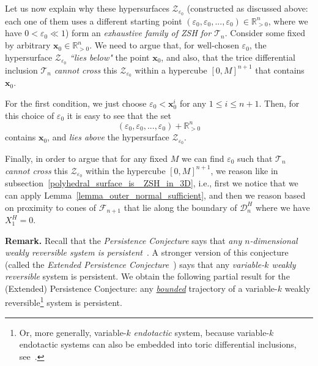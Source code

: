 \documentclass[12pt,letterpaper]{article}
\newcommand{\T}{\mathcal{T}}
\newcommand{\D}{\mathcal{D}}
\newcommand{\F}{\mathcal{F}}
\newcommand{\Z}{\mathcal{Z}}
\newcommand{\x}{\mathbf{x}}
\newcommand{\RRpn}{\mathbb{R}_{>0}^n}
\newcommand{\eps}{\varepsilon}
\begin{document}
Let us now explain why these hypersurfaces $\Z_{\eps_0}$ (constructed as discussed above: each one of them uses a different starting point $(\eps_0, \eps_0, ..., \eps_0) \in \RRpn$, where we have $0 < \eps_0 \ll 1$) form an {\em exhaustive family of ZSH for $\T_n$}. Consider some fixed by arbitrary $\x_0 \in \RRpn$. We need to argue that, for well-chosen $\eps_0$, the hypersurface $\Z_{\eps_0}$ {\em ``lies below"} the point $\x_0$, and also, that the trice differential inclusion  $\T_n$ {\it cannot cross} this $\Z_{\eps_0}$ within a hypercube $[0, M]^{n+1}$ that contains $\x_0$.

For the first condition, we just choose $\eps_0 < \x_0^i$ for any $1 \le i \le n+1$. Then, for this choice of $\eps_0$ it is easy to see that the  set 
$$
(\eps_0, \eps_0, ..., \eps_0) + \RRpn
$$
contains $\x_0$, and {\em lies above} the hypersurface $\Z_{\eps_0}$.

Finally, in order to argue that for any fixed $M$ we can find  $\eps_0$ such that $\T_n$ {\it cannot cross} this $\Z_{\eps_0}$ within the hypercube $[0, M]^{n+1}$, we reason like in subsection~\ref{polyhedral_surface_is_ ZSH_in_3D}, i.e., first we notice that we can apply Lemma~\ref{lemma_outer_normal_sufficient}, and then we reason based on proximity to cones of $\F_{n+1}$ that lie along the boundary of  $\D_n^H$ where we have $X_1^H = 0$. 












\bigskip
\bigskip
\bigskip
\bigskip
\bigskip
\bigskip
\bigskip
\bigskip
\bigskip  
\bigskip


{
\noindent
{\bf Remark.} Recall that the {\em Persistence Conjecture} says that {\em any $n$-dimensional weakly reversible system is persistent}~\cite{CNP}. A stronger version of this conjecture (called the {\em Extended Persistence Conjecture}~\cite{CNP}) says that any {\em variable-$k$ weakly reversible} system is persistent. 
We obtain the following partial result for the (Extended) Persistence Conjecture: any \ul{\em bounded} trajectory of a variable-$k$ weakly reversible\footnote{Or, more generally,  variable-$k$ {\em endotactic} system, because variable-$k$ endotactic systems can also be embedded into toric differential inclusions, see~\cite{Craciun_Deshpande_Endotactic_networks_and_TDIs}.} system is persistent. 
}
\end{document}
